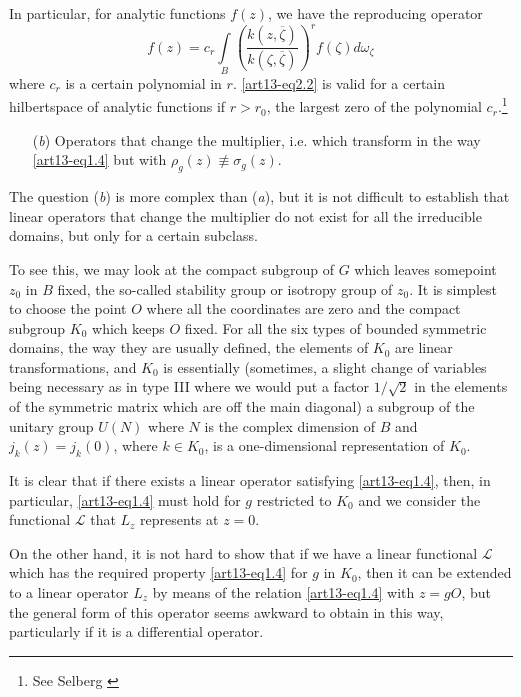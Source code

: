 In particular, for analytic functions $f(z)$, we have the reproducing operator
\begin{equation}
f(z)=c_{r}\int\limits_{B}\left(\frac{k(z,\overline{\zeta})}{k(\zeta,\overline{\zeta})}\right)^{r}f(\zeta)d\omega_{\zeta}\label{art13-eq2.2}
\end{equation}
where $c_{r}$ is a certain polynomial in $r$. \eqref{art13-eq2.2} is valid for a certain hilbertspace of analytic functions if $r>r_{0}$, the largest zero of the polynomial $c_{r}$.\footnote{See Selberg \cite{art13-key4}} 
\begin{itemize}
\item[({\em b})] Operators that change the multiplier, i.e. which transform in the way \eqref{art13-eq1.4} but with $\rho_{g}(z)\nequiv \sigma_{g}(z)$.
\end{itemize}

The question ({\em b}) is more complex than ({\em a}), but it is not difficult to establish that linear operators that change the multiplier do not exist for all the irreducible domains, but only for a certain subclass.

To see this, we may look at the compact subgroup of $G$ which leaves some\pageoriginale point $z_{0}$ in $B$ fixed, the so-called stability group or isotropy group of $z_{0}$. It is simplest to choose the point $O$ where all the coordinates are zero and the compact subgroup $K_{0}$ which keeps $O$ fixed. For all the six types of bounded symmetric domains, the way they are usually defined, the elements of $K_{0}$ are linear transformations, and $K_{0}$ is essentially (sometimes, a slight change of variables being necessary as in type III where we would put a factor $1/\sqrt{2}$ in the elements of the symmetric matrix which are off the main diagonal) a subgroup of the unitary group $U(N)$ where $N$ is the complex dimension of $B$ and $j_{k}(z)=j_{k}(0)$, where $k\in K_{0}$, is a one-dimensional representation of $K_{0}$.

It is clear that if there exists a linear operator satisfying \eqref{art13-eq1.4}, then, in particular, \eqref{art13-eq1.4} must hold for $g$ restricted to $K_{0}$ and we consider the functional $\mathscr{L}$ that $L_{z}$ represents at $z=0$.

On the other hand, it is not hard to show that if we have a linear functional $\mathscr{L}$ which has the required property \eqref{art13-eq1.4} for $g$ in $K_{0}$, then it can be extended to a linear operator $L_{z}$ by means of the relation \eqref{art13-eq1.4} with $z=gO$, but the general form of this operator seems awkward to obtain in this way, particularly if it is a differential operator.

